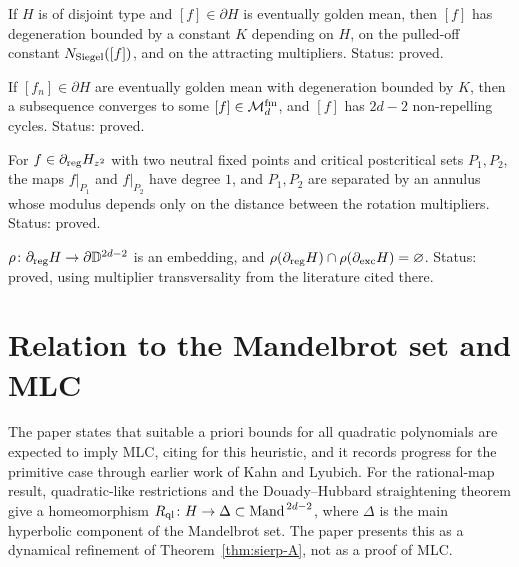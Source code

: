 \begin{theorem}
\label{thm:sierp-C}
If $H$ is of disjoint type and $[f]\in\partial H$ is eventually golden mean, then $[f]$ has degeneration bounded by a
constant $K$ depending on $H$, on the pulled-off constant $N_{\rm Siegel}([f])$, and on the attracting multipliers.  Status: proved.
\end{theorem}

\begin{theorem}
\label{thm:sierp-precompact}
If $[f_n]\in\partial H$ are eventually golden mean with degeneration bounded by $K$, then a subsequence converges to some
$[f]\in\mathcal M^{\rm fm}_d$, and $[f]$ has $2d-2$ non-repelling cycles.  Status: proved.
\end{theorem}

\begin{theorem}
\label{thm:sierp-D}
For $f\in\partial_{\rm reg}H_{z^2}$ with two neutral fixed points and critical postcritical sets $P_1,P_2$, the maps
$f|_{P_1}$ and $f|_{P_2}$ have degree $1$, and $P_1,P_2$ are separated by an annulus whose modulus depends only on the
distance between the rotation multipliers.  Status: proved.
\end{theorem}

\begin{proposition}
\label{prop:sierp-2-2}
$\rho\colon\partial_{\rm reg}H\to\partial\mathbb D^{2d-2}$ is an embedding, and $\rho(\partial_{\rm reg}H)\cap\rho(\partial_{\rm exc}H)=\varnothing$.
Status: proved, using multiplier transversality from the literature cited there.
\end{proposition}

\section{Relation to the Mandelbrot set and MLC}
\label{sec:digest-sierpinski-mlc}

The paper states that suitable a priori bounds for all quadratic polynomials are expected to imply MLC, citing
\cite{DudkoLyubichNeutral} for this heuristic, and it records progress for the primitive case through earlier work of
Kahn and Lyubich.  For the rational-map result, quadratic-like restrictions and the Douady--Hubbard straightening
theorem give a homeomorphism $R_{\rm ql}\colon H\to\Delta\subset\operatorname{Mand}^{\,2d-2}$, where $\Delta$ is the main
hyperbolic component of the Mandelbrot set.  The paper presents this as a dynamical refinement of
Theorem~\ref{thm:sierp-A}, not as a proof of MLC.


